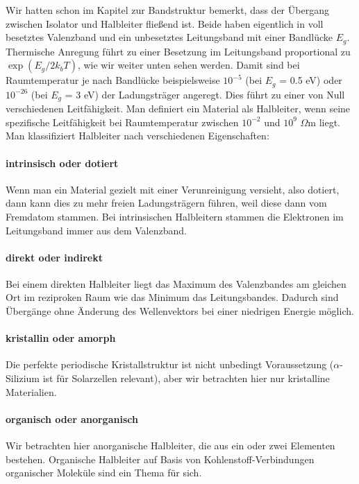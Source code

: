 Wir hatten schon im Kapitel zur Bandstruktur bemerkt, dass der Übergang zwischen Isolator und Halbleiter fließend ist. Beide haben eigentlich in voll besetztes Valenzband und ein unbesetztes Leitungsband mit einer Bandlücke $E_g$. Thermische Anregung führt zu einer Besetzung im Leitungsband proportional zu $\exp(E_g / 2 k_b T)$, wie wir weiter unten sehen werden. Damit sind bei Raumtemperatur je nach Bandlücke beispielsweise $10^{-5}$ (bei $E_g$ = 0.5 eV) oder  $10^{-26}$ (bei $E_g$ = 3 eV) der Ladungsträger angeregt. Dies führt zu einer von Null verschiedenen Leitfähigkeit. Man definiert ein Material als Halbleiter, wenn seine spezifische Leitfähigkeit bei Raumtemperatur zwischen $10^{-2}$ und $10^9$ $\Omega$m liegt. Man klassifiziert Halbleiter nach verschiedenen Eigenschaften:

\paragraph*{intrinsisch oder dotiert} Wenn man ein Material gezielt mit einer Verunreinigung versieht, also dotiert, dann kann dies zu mehr freien Ladungsträgern führen, weil diese dann vom Fremdatom stammen. Bei intrinsischen Halbleitern stammen die Elektronen im Leitungsband immer aus dem Valenzband.

\paragraph*{direkt oder indirekt} Bei einem direkten Halbleiter liegt das Maximum des Valenzbandes am gleichen Ort im reziproken Raum wie das Minimum das Leitungsbandes. Dadurch sind Übergänge ohne Änderung des Wellenvektors bei einer niedrigen Energie möglich.

\paragraph*{kristallin oder amorph} Die perfekte periodische Kristallstruktur ist nicht unbedingt Voraussetzung ($\alpha$-Silizium ist für Solarzellen relevant), aber wir betrachten hier nur kristalline Materialien.

\paragraph*{organisch oder anorganisch} Wir betrachten hier anorganische Halbleiter, die aus ein oder zwei Elementen bestehen. Organische Halbleiter auf Basis von Kohlenstoff-Verbindungen organischer Moleküle sind ein Thema  für sich.




